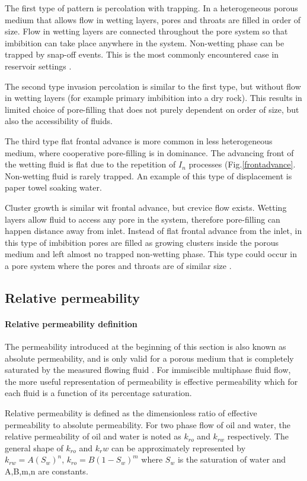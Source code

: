 The first type of pattern is percolation with trapping. In a heterogeneous porous medium that allows flow in wetting layers, pores and throats are filled in order of size. Flow in wetting layers are connected throughout the pore system so that imbibition can take place anywhere in the system. Non-wetting phase can be trapped by snap-off events. This is the most commonly encountered case in reservoir settings \citep{blunt2017multiphase}.

The second type invasion percolation is similar to the first type, but without flow in wetting layers (for example primary imbibition into a dry rock). This results in limited choice of pore-filling that does not purely dependent on order of size, but also the accessibility of fluids. 

The third type flat frontal advance is more common in less heterogeneous medium, where cooperative pore-filling is in dominance. The advancing front of the wetting fluid is flat due to the repetition of $I_n$ processes (Fig.\ref{frontadvance}. Non-wetting fluid is rarely trapped. An example of this type of displacement is paper towel soaking water. 

Cluster growth is similar wit frontal advance, but crevice flow exists. Wetting layers allow fluid to access any pore in the system, therefore pore-filling can happen distance away from inlet. Instead of flat frontal advance from the inlet, in this type of imbibition pores are filled as growing clusters inside the porous medium and left almost no trapped non-wetting phase. This type could occur in a pore system where the pores and throats are of similar size \citep{blunt2017multiphase}.

\subsection{Relative permeability}
\paragraph{Relative permeability definition}
The permeability introduced at the beginning of this section is also known as absolute permeability, and is only valid for a porous medium that is completely saturated by the measured flowing fluid \citep{honarpour2018relative}. For immiscible multiphase fluid flow, the more useful representation of permeability is effective permeability which for each fluid is a function of its percentage saturation.

Relative permeability is defined as the dimensionless ratio of effective permeability to absolute permeability. For two phase flow of oil and water, the relative permeability of oil and water is noted as $k_{ro}$ and $k_{rw}$ respectively. The general shape of $k_{ro}$ and $k_rw$ can be approximately represented by $k_{rw}=A(S_w)^n$, $k_{ro}=B(1-S_w)^m$ where $S_w$ is the saturation of water and A,B,m,n are constants.

